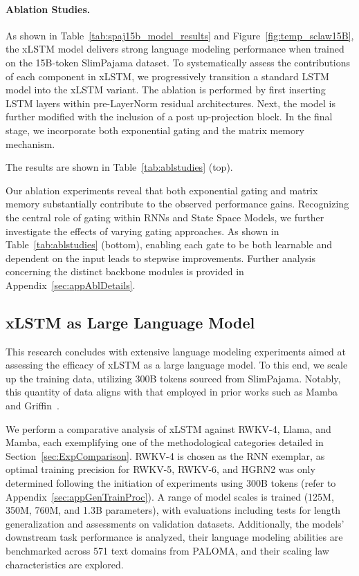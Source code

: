 \paragraph{Ablation Studies.}
As shown in Table~\ref{tab:spaj15b_model_results} and Figure~\ref{fig:temp_sclaw15B}, the xLSTM model delivers strong language modeling performance when trained on the 15B-token SlimPajama dataset. To systematically assess the contributions of each component in xLSTM, we progressively transition a standard LSTM model into the xLSTM variant. The ablation is performed by first inserting LSTM layers within pre-LayerNorm residual architectures. Next, the model is further modified with the inclusion of a post up-projection block. In the final stage, we incorporate both exponential gating and the matrix memory mechanism.

The results are shown in Table~\ref{tab:ablstudies} (top). 

Our ablation experiments reveal that both exponential gating and matrix memory substantially contribute to the observed performance gains. Recognizing the central role of gating within RNNs and State Space Models, we further investigate the effects of varying gating approaches. As shown in Table~\ref{tab:ablstudies} (bottom), enabling each gate to be both learnable and dependent on the input leads to stepwise improvements. Further analysis concerning the distinct backbone modules is provided in Appendix~\ref{sec:appAblDetails}.

\subsection{xLSTM as Large Language Model}
\label{sec:ExpLanguage}

This research concludes with extensive language modeling experiments aimed at assessing the efficacy of xLSTM as a large language model. To this end, we scale up the training data, utilizing 300B tokens sourced from SlimPajama. Notably, this quantity of data aligns with that employed in prior works such as Mamba~\citep{Gu:24arxiv} and Griffin~\citep{De:24arxiv}.

We perform a comparative analysis of xLSTM against RWKV-4, Llama, and Mamba, each exemplifying one of the methodological categories detailed in Section~\ref{sec:ExpComparison}. RWKV-4 is chosen as the RNN exemplar, as optimal training precision for RWKV-5, RWKV-6, and HGRN2 was only determined following the initiation of experiments using 300B tokens (refer to Appendix~\ref{sec:appGenTrainProc}). A range of model scales is trained (125M, 350M, 760M, and 1.3B parameters), with evaluations including tests for length generalization and assessments on validation datasets. Additionally, the models' downstream task performance is analyzed, their language modeling abilities are benchmarked across 571 text domains from PALOMA, and their scaling law characteristics are explored.

